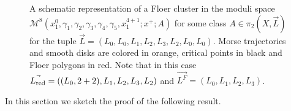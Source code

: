 \begin{figure}
	
	\caption{A schematic representation of a Floer cluster in the moduli space $\mathcal{M}^8(x_1^0,\gamma_1,\gamma_2,\gamma_3,\gamma_4,\gamma_5, x_1^{4+1}; x^+;A)$ for some class $A\in \pi_2(X,\vec{L})$ for the tuple $\vec{L} = (L_0,L_0,L_1,L_2,L_3,L_2,L_0,L_0)$. Morse trajectories and smooth disks are colored in orange, critical points in black and Floer polygons in red. Note that in this case $\vec{L_\textnormal{red}}=((L_0,2+2),L_1,L_2,L_3,L_2)$ and $\vec{L^F}= (L_0,L_1,L_2,L_3)$.}
	\label{figcluster}
\end{figure}
\noindent In this section we sketch the proof of the following result.
	
